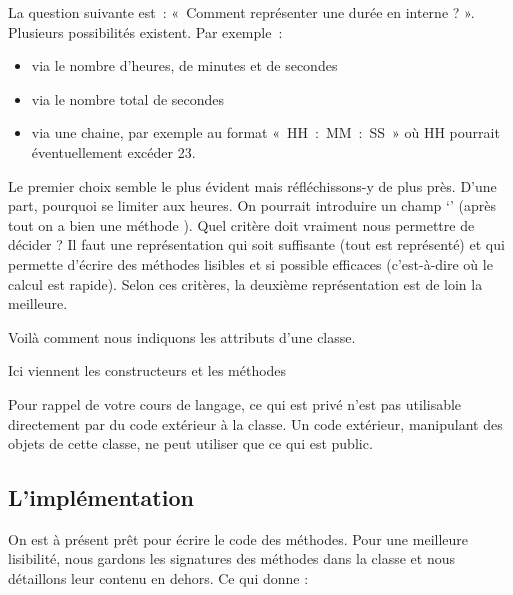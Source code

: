 		La question suivante est~: «~Comment représenter une durée en interne ?
		». Plusieurs possibilités existent. Par exemple~:	
		\begin{itemize}
			\item 
				via le nombre d’heures, de minutes et de secondes
			\item 
				via le nombre total de secondes
			\item 
				via une chaine, par exemple au format «~HH~:~MM~:~SS~» où HH pourrait
				éventuellement excéder 23.
		\end{itemize}
		
		Le premier choix semble le plus évident mais réfléchissons-y de plus
		près. D’une part, pourquoi se limiter aux heures. On pourrait
		introduire un champ ‘’ (après tout on a bien
		une méthode ). 		
		Quel critère doit vraiment nous permettre de décider ? Il faut une
		représentation qui soit suffisante (tout est représenté) et qui
		permette d’écrire des méthodes lisibles et si possible efficaces
		(c'est-à-dire où le calcul est rapide). Selon ces
		critères, la deuxième représentation est de loin la meilleure. 
		
		Voilà comment nous indiquons les attributs d'une classe.
		
		\begin{LDA}
				\Private
				\Public
					\LComment Ici viennent les constructeurs et les méthodes
			\EndClass
		\end{LDA}
	
		Pour rappel de votre cours de langage,
		ce qui est privé n'est pas utilisable directement 
		par du code extérieur à la classe.
		Un code extérieur, manipulant des objets de cette classe,
		ne peut utiliser que ce qui est public.
		
	\subsection{L'implémentation}
	
		On est à présent prêt pour écrire le code des méthodes. 
		Pour une meilleure lisibilité,
		nous gardons les signatures des méthodes dans la classe
		et nous détaillons leur contenu en dehors.
		Ce qui donne :
		
